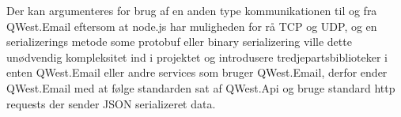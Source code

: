 Der kan argumenteres for brug af en anden type kommunikationen til og fra QWest.Email eftersom at node.js har muligheden for rå TCP og UDP, og en serializerings metode some protobuf \cite{ProtoBuf} eller binary serializering \cite{CsharpBinarySerialization} ville dette unødvendig kompleksitet ind i projektet og introdusere tredjepartsbiblioteker i enten QWest.Email eller andre services som bruger QWest.Email, derfor ender QWest.Email med at følge standarden sat af QWest.Api og bruge standard http requests der sender JSON serializeret data.